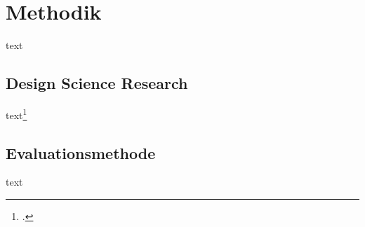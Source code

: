 \section{Methodik}
text
\subsection{Design Science Research}
text\footcite{FrauchigerDaniel2017AvDS}
\subsection{Evaluationsmethode}
text